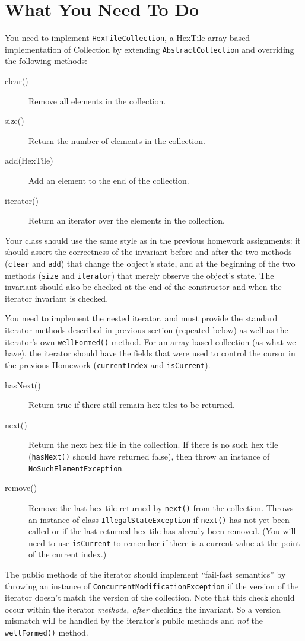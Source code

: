 \documentclass[11pt]{article}
\begin{document}
\section{What You Need To Do}

You need to implement \texttt{HexTileCollection}, a \textsf{HexTile} array-based implementation of
\textsf{Collection} by extending \verb|AbstractCollection| and overriding the following methods:
\begin{description}
\item[clear()] Remove all elements in the collection.
\item[size()] Return the number of elements in the collection.
\item[add(HexTile)] Add an element to the end of the collection.
\item[iterator()] Return an iterator over the elements in the collection.
\end{description}
Your class should use the same style as in the previous homework
assignments: it should assert the correctness of the invariant before and after the 
two methods (\verb|clear| and \verb|add|) that change the object's state, and
at the beginning of the two
methods (\verb|size| and \verb|iterator|) that merely observe the
object's state.  The invariant should also be checked at the end of the
constructor and when the iterator invariant is checked.

You need to implement the nested iterator, and must provide the standard iterator methods described in previous section (repeated below) as well as the iterator's own \verb|wellFormed()| method.
For an array-based collection (as what we have), the iterator 
should have the fields that were used to control the cursor in the
previous Homework (\verb|currentIndex| and \verb|isCurrent|).
\begin{description}
\item[hasNext()] Return true if there still remain hex tiles to be returned.
\item[next()] Return the next hex tile in the collection.  If there is
  no such hex tile (\verb|hasNext()| should have returned
  false), then throw an instance of \verb|NoSuchElementException|.
\item[remove()] Remove the last hex tile returned by \verb|next()| from
  the collection.  Throws an instance of class \verb|IllegalStateException| if
  \verb|next()| has not yet been called or if the last-returned hex tile has already
  been removed.  (You will need to use \verb|isCurrent| to remember if
  there is a current value at the point of the current index.)
\end{description}
The public methods of the iterator should implement ``fail-fast semantics'' by throwing
an instance of \verb|ConcurrentModificationException| if the version
of the iterator doesn't match the version of the collection. Note that this check should occur
within the iterator \emph{methods, after} checking the invariant. So a version mismatch will be handled
by the iterator's public methods and \emph{not} the
\verb|wellFormed()| method.
\end{document}

